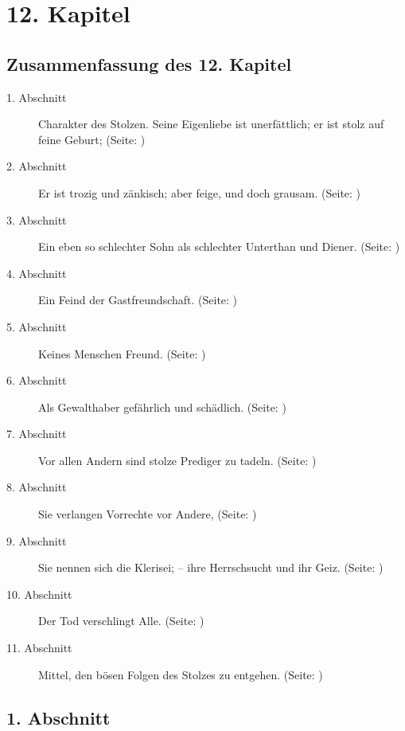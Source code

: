 

\chapter{12. Kapitel} \label{kap12}

\section{Zusammenfassung des 12. Kapitel}
\small
\begin{description}
\item[1. Abschnitt] Charakter des Stolzen. Seine Eigenliebe ist unerfättlich; er
ist stolz auf feine Geburt; (Seite: \pageref{kap12_ab1})
\item[2. Abschnitt] Er ist trozig und zänkisch; aber feige, und doch grausam. (Seite: \pageref{kap12_ab2})
\item[3. Abschnitt] Ein eben so schlechter Sohn als schlechter Unterthan und
Diener. (Seite: \pageref{kap12_ab3})
\item[4. Abschnitt] Ein Feind der Gastfreundschaft. (Seite: \pageref{kap12_ab4})
\item[5. Abschnitt] Keines Menschen Freund. (Seite: \pageref{kap12_ab5})
\item[6. Abschnitt] Als Gewalthaber gefährlich und schädlich. (Seite: \pageref{kap12_ab6})
\item[7. Abschnitt] Vor allen Andern sind stolze Prediger zu tadeln. (Seite: \pageref{kap12_ab7})
\item[8. Abschnitt] Sie verlangen Vorrechte vor Andere, (Seite: \pageref{kap12_ab8})
\item[9. Abschnitt] Sie nennen sich die Klerisei; -- ihre Herrschsucht und ihr
Geiz. (Seite: \pageref{kap12_ab9})
\item[10. Abschnitt] Der Tod verschlingt Alle. (Seite: \pageref{kap12_ab10})
\item[11. Abschnitt] Mittel, den bösen Folgen des Stolzes zu entgehen. (Seite: \pageref{kap12_ab11})
\end{description}
\normalsize

\section{1. Abschnitt} \label{kap12_ab1}

